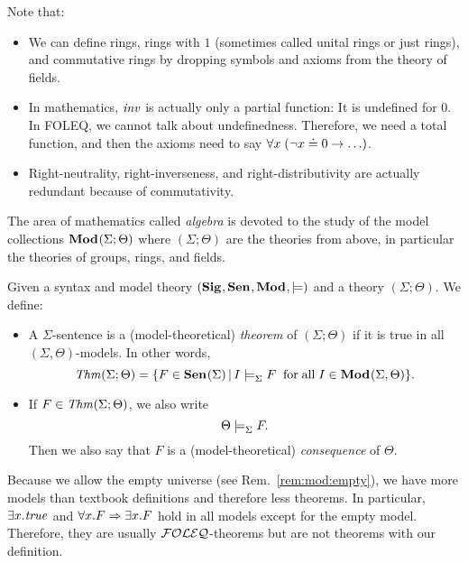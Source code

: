 \begin{example}[Fields]
Note that:
\begin{itemize}
\item We can define rings, rings with $1$ (sometimes called unital rings or just rings), and commutative rings by dropping symbols and axioms from the theory of fields.
\item In mathematics, $\mathit{inv}$ is actually only a partial function: It is undefined for $0$. In FOLEQ, we cannot talk about undefinedness. Therefore, we need a total function, and then the axioms need to say $\forall x\;(\neg x\doteq 0\rightarrow \ldots)$.
\item Right-neutrality, right-inverseness, and right-distributivity are actually redundant because of commutativity.
\end{itemize}
\end{example}
\medskip
The area of mathematics called \emph{algebra} is devoted to the study of the model collections ${\mathbf{Mod}^{}}(\Sigma;\Theta)$ where $(\Sigma;\Theta)$ are the theories from above, in particular the theories of groups, rings, and fields.
\bigskip

\begin{definition}[Theorems]\label{def:mod:consequence}
Given a syntax and model theory $({\mathbf{Sig}^{}},{\mathbf{Sen}^{}},{\mathbf{Mod}^{}},\models)$ and a theory $(\Sigma;\Theta)$. We define:
\begin{itemize}
\item A $\Sigma$-sentence is a (model-theoretical) \emph{theorem} of $(\Sigma;\Theta)$ if it is true in all $(\Sigma,\Theta)$-models. In other words,
 \[\mathit{Thm}(\Sigma;\Theta)=\{F\in{\mathbf{Sen}^{}}(\Sigma) \,|\, I\models^{}_{\Sigma}F \;\;\mathrm{for}\;\mathrm{all}\; I\in{\mathbf{Mod}^{}}(\Sigma,\Theta)\}.\]
\item If $F\in\mathit{Thm}(\Sigma;\Theta)$, we also write
 \[\Theta\models^{}_{\Sigma}F.\]
 Then we also say that $F$ is a (model-theoretical) \emph{consequence} of $\Theta$.
\end{itemize}
\end{definition}

\begin{remark}\label{rem:mod:empty:thm}
Because we allow the empty universe (see Rem.~\ref{rem:mod:empty}), we have more models than textbook definitions and therefore less theorems.
In particular, $\exists x.\mathit{true}$ and $\forall x.F\Rightarrow\exists x.F$ hold in all models except for the empty model.
Therefore, they are usually ${\mathcal{FOLEQ}}$-theorems but are not theorems with our definition.
\end{remark}
\medskip

